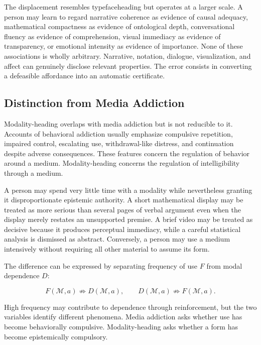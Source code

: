 \documentclass[11pt]{article}
\newcommand{\modality}{\mathcal{M}}
\begin{document}
The displacement resembles typefaceheading but operates at a larger scale. A
person may learn to regard narrative coherence as evidence of causal
adequacy, mathematical compactness as evidence of ontological depth,
conversational fluency as evidence of comprehension, visual immediacy as
evidence of transparency, or emotional intensity as evidence of importance.
None of these associations is wholly arbitrary. Narrative, notation,
dialogue, visualization, and affect can genuinely disclose relevant
properties. The error consists in converting a defeasible affordance into an
automatic certificate.

\subsection{Distinction from Media Addiction}

Modality-heading overlaps with media addiction but is not reducible to it.
Accounts of behavioral addiction usually emphasize compulsive repetition,
impaired control, escalating use, withdrawal-like distress, and continuation
despite adverse consequences. These features concern the regulation of
behavior around a medium. Modality-heading concerns the regulation of
intelligibility through a medium.

A person may spend very little time with a modality while nevertheless
granting it disproportionate epistemic authority. A short mathematical
display may be treated as more serious than several pages of verbal argument
even when the display merely restates an unsupported premise. A brief video
may be treated as decisive because it produces perceptual immediacy, while a
careful statistical analysis is dismissed as abstract. Conversely, a person
may use a medium intensively without requiring all other material to assume
its form.

The difference can be expressed by separating frequency of use \(F\) from
modal dependence \(D\):

\begin{equation}
  F(\modality,a)
  \not\Rightarrow
  D(\modality,a),
  \qquad
  D(\modality,a)
  \not\Rightarrow
  F(\modality,a).
  \label{eq:frequency-dependence}
\end{equation}

High frequency may contribute to dependence through reinforcement, but the two
variables identify different phenomena. Media addiction asks whether use has
become behaviorally compulsive. Modality-heading asks whether a form has
become epistemically compulsory.
\end{document}
